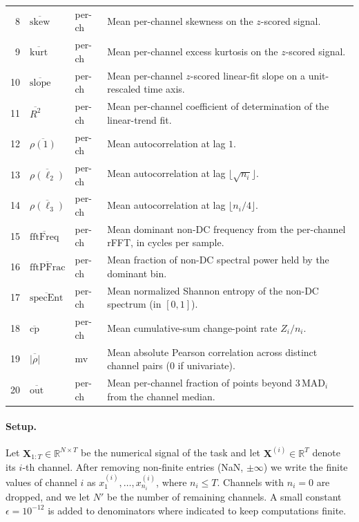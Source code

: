 \begin{table}[t]
\begin{tabular}{rllp{}}
8  & $\overline{\mathrm{skew}}$     & per-ch & Mean per-channel skewness on the $z$-scored signal. \\
9  & $\overline{\mathrm{kurt}}$     & per-ch & Mean per-channel excess kurtosis on the $z$-scored signal. \\
10 & $\overline{\mathrm{slope}}$    & per-ch & Mean per-channel $z$-scored linear-fit slope on a unit-rescaled time axis. \\
11 & $\overline{R^2}$               & per-ch & Mean per-channel coefficient of determination of the linear-trend fit. \\
12 & $\overline{\rho(1)}$           & per-ch & Mean autocorrelation at lag $1$. \\
13 & $\overline{\rho(\ell_2)}$      & per-ch & Mean autocorrelation at lag $\lfloor\sqrt{n_i}\rfloor$. \\
14 & $\overline{\rho(\ell_3)}$      & per-ch & Mean autocorrelation at lag $\lfloor n_i/4\rfloor$. \\
15 & $\overline{\mathrm{fftFreq}}$  & per-ch & Mean dominant non-DC frequency from the per-channel rFFT, in cycles per sample. \\
16 & $\overline{\mathrm{fftPFrac}}$ & per-ch & Mean fraction of non-DC spectral power held by the dominant bin. \\
17 & $\overline{\mathrm{specEnt}}$  & per-ch & Mean normalized Shannon entropy of the non-DC spectrum (in $[0,1]$). \\
18 & $\overline{\mathrm{cp}}$       & per-ch & Mean cumulative-sum change-point rate $Z_i / n_i$. \\
19 & $\overline{|\rho|}$            & mv     & Mean absolute Pearson correlation across distinct channel pairs ($0$ if univariate). \\
20 & $\overline{\mathrm{out}}$      & per-ch & Mean per-channel fraction of points beyond $3\,\mathrm{MAD}_i$ from the channel median. \\
\bottomrule
\end{tabular}
\end{table}


\paragraph{Setup.}
Let $\mathbf{X}_{1:T} \in \mathbb{R}^{N \times T}$ be the numerical
signal of the task and let $\mathbf{X}^{(i)} \in \mathbb{R}^{T}$ denote
its $i$-th channel. After removing non-finite entries (NaN, $\pm\infty$)
we write the finite values of channel $i$ as
$x^{(i)}_1, \ldots, x^{(i)}_{n_i}$, where $n_i \le T$. Channels with
$n_i = 0$ are dropped, and we let $N'$ be the number of remaining
channels. A small constant $\epsilon = 10^{-12}$ is added to
denominators where indicated to keep computations finite.

